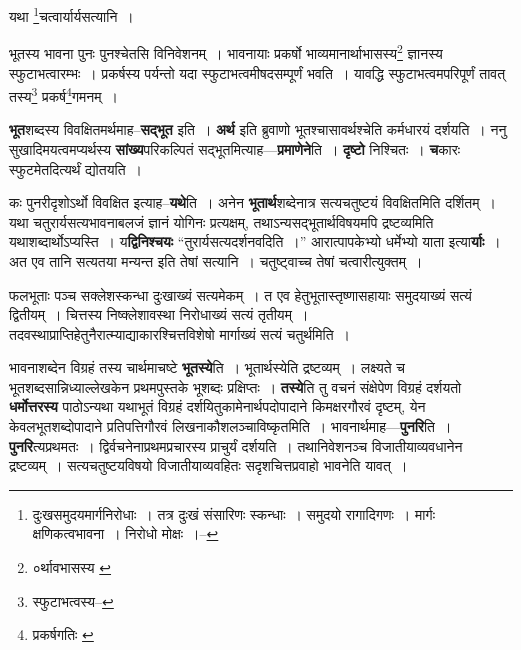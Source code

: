 \documentclass[article,12pt,a4paper]{memoir}
\begin{document}
	  \pstart यथा \footnote{दुःखसमुदयमार्गनिरोधाः । तत्र दुःखं संसारिणः स्कन्धाः । समुदयो रागादिगणः । मार्गः क्षणिकत्वभावना । निरोधो मोक्षः ।--\cite{dp-msD-n}}चत्वार्यार्यसत्यानि ।
	\pend
      
	  \bigskip
	  \begingroup
	

	  \pstart भूतस्य भावना पुनः पुनश्चेतसि विनिवेशनम् । भावनायाः प्रकर्षो भाव्यमानार्थाभासस्य\footnote{०र्थावभासस्य \cite{dp-msB} \cite{dp-edN}} ज्ञानस्य स्फुटाभत्वारम्भः । प्रकर्षस्य पर्यन्तो यदा स्फुटाभत्वमीषदसम्पूर्णं भवति । यावद्धि स्फुटाभत्वमपरिपूर्णं तावत् तस्य\footnote{स्फुटाभत्वस्य--\cite{dp-msD-n}} प्रकर्ष\footnote{प्रकर्षगतिः \cite{dp-msA} \cite{dp-edP} \cite{dp-edH} \cite{dp-edE} \cite{dp-edN}}गमनम् ।
	\pend
      
	  \endgroup
	

	  \pstart \textbf{भूत}शब्दस्य विवक्षितमर्थमाह--\textbf{सद्भूत} इति । \textbf{अर्थ} इति ब्रुवाणो भूतश्चासावर्थश्चेति कर्मधारयं दर्शयति । ननु सुखादिमयत्वमप्यर्थस्य \textbf{सांख्य}परिकल्पितं सद्भूतमित्याह—\textbf{प्रमाणेने}ति । \textbf{दृष्टो} निश्चितः । \textbf{च}कारः स्फुटमेतदित्यर्थं द्योतयति ।
	\pend
      

	  \pstart कः पुनरीदृशोऽर्थो विवक्षित इत्याह--\textbf{यथे}ति । अनेन \textbf{भूतार्थ}शब्देनात्र सत्यचतुष्टयं विवक्षितमिति दर्शितम् । यथा चतुरार्यसत्यभावनाबलजं ज्ञानं योगिनः प्रत्यक्षम्, तथाऽन्यसद्भूतार्थविषयमपि द्रष्टव्यमिति यथाशब्दार्थोऽप्यस्ति । य\textbf{द्विनिश्चयः} “तुरार्यसत्यदर्शनवदिति ।” आरात्पापकेभ्यो धर्मेभ्यो याता इत्या\textbf{र्याः} । अत एव तानि सत्यतया मन्यन्त इति तेषां सत्यानि । चतुष्ट्वाच्च तेषां चत्वारीत्युक्तम् ।
	\pend
      

	  \pstart फलभूताः पञ्च सक्लेशस्कन्धा दुःखाख्यं सत्यमेकम् । त एव हेतुभूतास्तृष्णासहायाः समुदयाख्यं सत्यं द्वितीयम् । चित्तस्य निष्क्लेशावस्था निरोधाख्यं सत्यं तृतीयम् । तदवस्थाप्राप्तिहेतुनैरात्म्याद्याकारश्चित्तविशेषो मार्गाख्यं सत्यं चतुर्थमिति ।
	\pend
      

	  \pstart भावनाशब्देन विग्रहं तस्य चार्थमाचष्टे \textbf{भूतस्ये}ति । भूतार्थस्येति द्रष्टव्यम् । लक्ष्यते च भूतशब्दसान्निध्याल्लेखकेन प्रथमपुस्तके भूशब्दः प्रक्षिप्तः । \textbf{तस्ये}ति तु वचनं संक्षेपेण विग्रहं दर्शयतो \textbf{धर्मोत्तरस्य} पाठोऽन्यथा यथाभूतं विग्रहं दर्शयितुकामेनार्थपदोपादाने किमक्षरगौरवं दृष्टम्, येन केवलभूतशब्दोपादाने प्रतिपत्तिगौरवं लिखनाकौशलञ्चाविष्कृतमिति । भावनार्थमाह—\textbf{पुनरि}ति । \textbf{पुनरि}त्यप्रथमतः । द्विर्वचनेनाप्रथमप्रचारस्य प्राचुर्यं दर्शयति । तथानिवेशनञ्च विजा\leavevmode{}तीयाव्यवधानेन द्रष्टव्यम् । सत्यचतुष्टयविषयो विजातीयाव्यवहितः सदृशचित्तप्रवाहो भावनेति यावत् ।
	\pend
      \leavevmode{}
	  \bigskip
	  \begingroup
	
\end{document}
